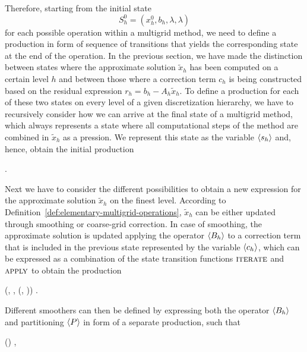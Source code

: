 Therefore, starting from the initial state 
\begin{equation*}
	S^0_h = (x_h^0, b_h, \lambda, \lambda)
\end{equation*}
for each possible operation within a multigrid method, we need to define a production in form of sequence of transitions that yields the corresponding state at the end of the operation.
In the previous section, we have made the distinction between states where the approximate solution $\tilde{x}_h$ has been computed on a certain level $h$ and between those where a correction term $c_h$ is being constructed based on the residual expression $r_h = b_h - A_h \tilde{x}_h$.
To define a production for each of these two states on every level of a given discretization hierarchy, we have to recursively consider how we can arrive at the final state of a multigrid method, which always represents a state where all computational steps of the method are combined in $\tilde{x}_h$ as a pression.
We represent this state as the variable $\langle s_h \rangle$ and, hence, obtain the initial production
\begin{bnf}
	 {
	}.
\end{bnf}
Next we have to consider the different possibilities to obtain a new expression for the approximate solution $\tilde{x}_{h}$ on the finest level.
According to Definition~\ref{def:elementary-multigrid-operations}, $\tilde{x}_{h}$ can be either updated through smoothing or coarse-grid correction.
In case of smoothing, the approximate solution is updated applying the operator $\langle B_h \rangle$ to a correction term that is included in the previous state represented by the variable $\langle c_h \rangle$, which can be expressed as a combination of the state transition functions $\textsc{iterate}$ and $\textsc{apply}$ to obtain the production
\begin{bnf}
	 {
		(\bnfts{$\omega$}, \bnfsp {}, \bnfsp {}(, \bnfsp {}))
	}.
\label{prod:smoothing}
\end{bnf}
Different smoothers can then be defined by expressing both the operator $\langle B_h \rangle$ and partitioning $\langle P \rangle$ in form of a separate production, such that
\begin{bnf}
	 {
		() \bnfsp {} \bnfsp {}
	},
\label{prod:smoothing-operator}
\end{bnf}
